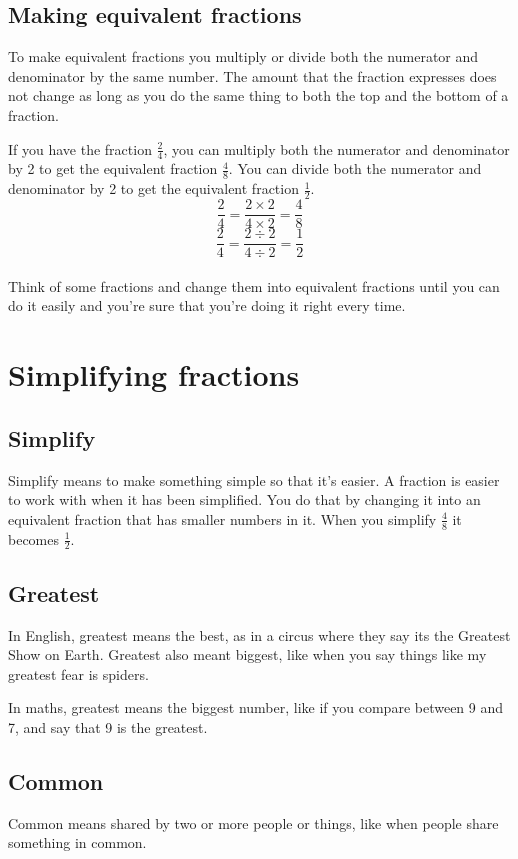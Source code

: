 \documentclass[16pt]{article}
\begin{document}
\begin{spacing}{1.25}
\pagebreak

\subsection*{Making equivalent fractions}

To make equivalent fractions you multiply or divide both the numerator and denominator by the same number. The amount that the fraction expresses does not change as long as you do the same thing to both the top and the bottom of a fraction.

If you have the fraction $\frac{2}{4}$, you can multiply both the numerator and denominator by 2 to get the equivalent fraction $\frac{4}{8}$. You can divide both the numerator and denominator by 2 to get the equivalent fraction $\frac{1}{2}$.
$$\frac{2}{4} = \frac{2 \times 2}{4 \times 2} = \frac{4}{8}$$
$$\frac{2}{4} = \frac{2 \div 2}{4 \div 2} = \frac{1}{2}$$\\

Think of some fractions and change them into equivalent fractions until you can do it easily and you're sure that you're doing it right every time.

\pagebreak

\section{Simplifying fractions}

\subsection*{Simplify} Simplify means to make something simple so that it's easier. A fraction is easier to work with when it has been simplified. You do that by changing it into an equivalent fraction that has smaller numbers in it. When you simplify $\frac{4}{8}$ it becomes $\frac{1}{2}$.

\subsection*{Greatest} In English, greatest means the best, as in a circus where they say its the Greatest Show on Earth. Greatest also meant biggest, like when you say things like my greatest fear is spiders.

In maths, greatest means the biggest number, like if you compare between 9 and 7, and say that 9 is the greatest.

\subsection*{Common} Common means shared by two or more people or things, like when people share something in common.


\end{spacing}
\end{document}
